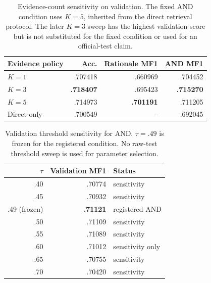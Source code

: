 \documentclass[11pt]{article}
\begin{document}
\begin{table}[t]
\centering\scriptsize
\begin{tabular}{@{}lrrr@{}}
\toprule
Evidence policy & Acc. & Rationale MF1 & AND MF1\\
\midrule
$K=1$ & .707418 & .660969 & .704452\\
$K=3$ & \textbf{.718407} & .695423 & \textbf{.715270}\\
$K=5$ & .714973 & \textbf{.701191} & .711205\\
Direct-only & .700549 & -- & .692045\\
\bottomrule
\end{tabular}
\caption{Evidence-count sensitivity on validation. The fixed AND condition uses $K=5$, inherited from the direct retrieval protocol. The later $K=3$ sweep has the highest validation score but is not substituted for the fixed condition or used for an official-test claim.}\label{tab:topk}
\end{table}

\begin{table}[t]
\centering\scriptsize
\begin{tabular}{@{}rrl@{}}
\toprule
$\tau$ & Validation MF1 & Status\\
\midrule
.40 & .70774 & sensitivity\\
.45 & .70932 & sensitivity\\
.49 (frozen) & \textbf{.71121} & registered AND\\
.50 & .71109 & sensitivity\\
.55 & .71089 & sensitivity\\
.60 & .71012 & sensitivity only\\
.65 & .70755 & sensitivity\\
.70 & .70420 & sensitivity\\
\bottomrule
\end{tabular}
\caption{Validation threshold sensitivity for AND. $\tau=.49$ is frozen for the registered condition. No raw-test threshold sweep is used for parameter selection.}\label{tab:threshold}
\end{table}
\end{document}
